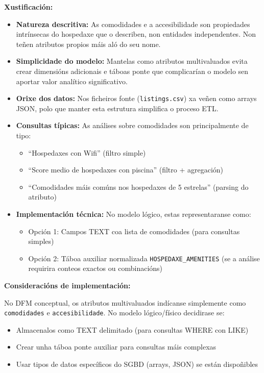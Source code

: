 \documentclass[12pt,a4paper]{article}
\begin{document}
\textbf{Xustificación:}
\begin{itemize}
    \item \textbf{Natureza descritiva:} As comodidades e a accesibilidade son propiedades intrínsecas do hospedaxe que o describen, non entidades independentes. Non teñen atributos propios máis aló do seu nome.
    \item \textbf{Simplicidade do modelo:} Mantelas como atributos multivaluados evita crear dimensións adicionais e táboas ponte que complicarían o modelo sen aportar valor analítico significativo.
    \item \textbf{Orixe dos datos:} Nos ficheiros fonte (\texttt{listings.csv}) xa veñen como arrays JSON, polo que manter esta estrutura simplifica o proceso ETL.
    \item \textbf{Consultas típicas:} As análises sobre comodidades son principalmente de tipo:
        \begin{itemize}
            \item ``Hospedaxes con Wifi'' (filtro simple)
            \item ``Score medio de hospedaxes con piscina'' (filtro + agregación)
            \item ``Comodidades máis comúns nos hospedaxes de 5 estrelas'' (parsing do atributo)
        \end{itemize}
    \item \textbf{Implementación técnica:} No modelo lógico, estas representaranse como:
        \begin{itemize}
            \item Opción 1: Campos TEXT coa lista de comodidades (para consultas simples)
            \item Opción 2: Táboa auxiliar normalizada \texttt{HOSPEDAXE\_AMENITIES} (se a análise requirira conteos exactos ou combinacións)
        \end{itemize}
\end{itemize}

\textbf{Consideracións de implementación:}

No DFM conceptual, os atributos multivaluados indícanse simplemente como \texttt{comodidades} e \texttt{accesibilidade}. No modelo lógico/físico decidirase se:
\begin{itemize}
    \item Almacenalos como TEXT delimitado (para consultas WHERE con LIKE)
    \item Crear unha táboa ponte auxiliar para consultas máis complexas
    \item Usar tipos de datos específicos do SGBD (arrays, JSON) se están dispoñibles
\end{itemize}
\end{document}
